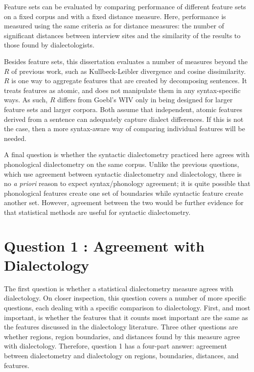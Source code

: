 Feature sets can be evaluated by comparing performance of different
feature sets on a fixed corpus and with a fixed distance
measure. Here, performance is measured using the same criteria as for
distance measures: the number of significant distances between
interview sites and the similarity of the results to those found by
dialectologists.

Besides feature sets, this dissertation evaluates a number of measures
beyond the $R$ of previous work, such as Kullbeck-Leibler divergence
and cosine dissimilarity. $R$ is one way to aggregate features that
are created by decomposing sentences. It treats features as atomic,
and does not manipulate them in any syntax-specific ways. As such, $R$
differs from Goebl's WIV only in being designed for larger feature
sets and larger corpora. Both assume that independent, atomic features
derived from a sentence can adequately capture dialect differences. If
this is not the case, then a more syntax-aware way of comparing
individual features will be needed.

A final question is whether the syntactic dialectometry practiced here
agrees with phonological dialectometry on the same corpus. Unlike the
previous questions, which use agreement between syntactic
dialectometry and dialectology, there is no {\it a priori} reason to
expect syntax/phonology agreement; it is quite possible that
phonological features create one set of boundaries while syntactic
feature create another set. However, agreement between the two would
be further evidence for that statistical methods are useful for
syntactic dialectometry.

\section{Question 1 : Agreement with Dialectology}

The first question is whether a statistical dialectometry measure
agrees with dialectology. On closer inspection, this question covers a
number of more specific questions, each dealing with a specific
comparison to dialectology. First, and most important, is whether the features that
it counts most important are the same as the features discussed in the
dialectology literature. Three other questions are whether
regions, region boundaries, and distances found by this measure agree with
dialectology. Therefore, question 1 has a four-part
answer: agreement between dialectometry and dialectology on regions,
boundaries, distances, and features.

